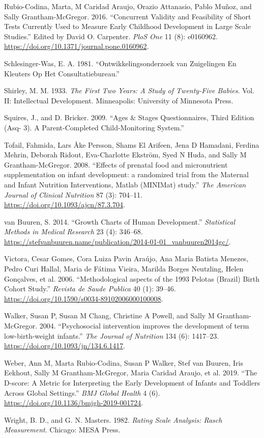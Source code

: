 \documentclass[
]{book}
\begin{document}
\leavevmode\hypertarget{ref-Rubio-Codina2016}{}%
Rubio-Codina, Marta, M Caridad Araujo, Orazio Attanasio, Pablo Muñoz, and Sally Grantham-McGregor. 2016. ``Concurrent Validity and Feasibility of Short Tests Currently Used to Measure Early Childhood Development in Large Scale Studies.'' Edited by David O. Carpenter. \emph{PloS One} 11 (8): e0160962. \url{https://doi.org/10.1371/journal.pone.0160962}.

\leavevmode\hypertarget{ref-schlesinger1981}{}%
Schlesinger-Was, E. A. 1981. ``Ontwikkelingsonderzoek van Zuigelingen En Kleuters Op Het Consultatiebureau.''

\leavevmode\hypertarget{ref-shirley1933}{}%
Shirley, M. M. 1933. \emph{The First Two Years: A Study of Twenty-Five Babies}. Vol. II: Intellectual Development. Minneapolis: University of Minnesota Press.

\leavevmode\hypertarget{ref-squires2009}{}%
Squires, J., and D. Bricker. 2009. ``Ages \& Stages Questionnaires, Third Edition (Asq- 3). A Parent-Completed Child-Monitoring System.''

\leavevmode\hypertarget{ref-Tofail2008}{}%
Tofail, Fahmida, Lars Åke Persson, Shams El Arifeen, Jena D Hamadani, Ferdina Mehrin, Deborah Ridout, Eva-Charlotte Ekström, Syed N Huda, and Sally M Grantham-McGregor. 2008. ``Effects of prenatal food and micronutrient supplementation on infant development: a randomized trial from the Maternal and Infant Nutrition Interventions, Matlab (MINIMat) study.'' \emph{The American Journal of Clinical Nutrition} 87 (3): 704--11. \url{https://doi.org/10.1093/ajcn/87.3.704}.

\leavevmode\hypertarget{ref-vanbuuren2014}{}%
van Buuren, S. 2014. ``Growth Charts of Human Development.'' \emph{Statistical Methods in Medical Research} 23 (4): 346--68. \url{https://stefvanbuuren.name/publication/2014-01-01_vanbuuren2014gc/}.

\leavevmode\hypertarget{ref-Victora2006}{}%
Victora, Cesar Gomes, Cora Luiza Pavin Araújo, Ana Maria Batista Menezes, Pedro Curi Hallal, Maria de Fátima Vieira, Marilda Borges Neutzling, Helen Gonçalves, et al. 2006. ``Methodological aspects of the 1993 Pelotas (Brazil) Birth Cohort Study.'' \emph{Revista de Saude Publica} 40 (1): 39--46. \url{https://doi.org/10.1590/s0034-89102006000100008}.

\leavevmode\hypertarget{ref-Walker2004}{}%
Walker, Susan P, Susan M Chang, Christine A Powell, and Sally M Grantham-McGregor. 2004. ``Psychosocial intervention improves the development of term low-birth-weight infants.'' \emph{The Journal of Nutrition} 134 (6): 1417--23. \url{https://doi.org/10.1093/jn/134.6.1417}.

\leavevmode\hypertarget{ref-Weber2019}{}%
Weber, Ann M, Marta Rubio-Codina, Susan P Walker, Stef van Buuren, Iris Eekhout, Sally M Grantham-McGregor, Maria Caridad Araujo, et al. 2019. ``The D-score: A Metric for Interpreting the Early Development of Infants and Toddlers Across Global Settings.'' \emph{BMJ Global Health} 4 (6). \url{https://doi.org/10.1136/bmjgh-2019-001724}.

\leavevmode\hypertarget{ref-wright1982}{}%
Wright, B. D., and G. N. Masters. 1982. \emph{Rating Scale Analysis: Rasch Measurement}. Chicago: MESA Press.
\end{document}
